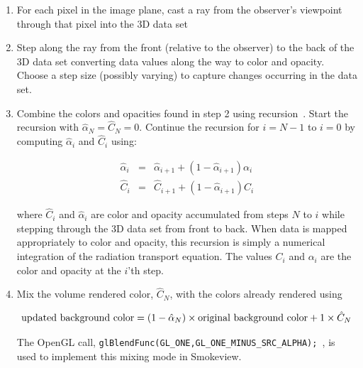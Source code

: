 \begin{enumerate}

\item For each pixel in the image plane, cast a ray from the observer's viewpoint through that pixel into the 3D data set

\item Step along the ray from the front (relative to the observer) to the back of the 3D data set converting data values along the way to color and opacity.  Choose a step size (possibly varying) to capture changes occurring in the data set.

\item
Combine the colors and opacities found in step 2 using recursion~\cite[Chapter 39]{gpugems}.
Start the recursion with $\hat{\alpha}_{N}=\hat{C}_{N}=0$. Continue the recursion for $i=N-1$ to $i=0$ by computing $\hat{\alpha}_i$ and $\hat{C}_i$ using:

\begin{eqnarray*}
\nonumber
\hat{\alpha}_i&=&\hat{\alpha}_{i+1}+\left(1-\hat{\alpha}_{i+1}\right)\alpha_i\\
\hat{C}_i&=&\hat{C}_{i+1}+\left(1-\hat{\alpha}_{i+1}\right)C_i
\end{eqnarray*}

where $\hat{C}_i$ and $\hat{\alpha}_i$ are color and opacity accumulated from steps $N$ to $i$ while stepping through the 3D data set from front to back.  When data is mapped appropriately to color and opacity, this recursion is simply a numerical integration of the radiation transport equation.
The values $C_i$ and $\alpha_i$ are the color and opacity at the $i$'th step.

\item Mix the volume rendered color, $\hat{C}_N$, with the colors already rendered using

\begin{eqnarray*}
\noindent\mbox{updated background color} = (1-\hat{\alpha}_N)\times \mbox{original background color} + 1\times\hat{C}_N
\end{eqnarray*}

The OpenGL call, {\tt   glBlendFunc(GL\_ONE,GL\_ONE\_MINUS\_SRC\_ALPHA); }, is used to implement this mixing mode in Smokeview.
\end{enumerate}


